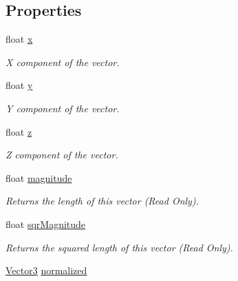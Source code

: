 \subsection*{Properties}
\begin{DoxyCompactItemize}
\item 
float \mbox{\hyperlink{class_lua_1_1_vector3_af2367a6c9fb9484cd8703ef20bbe3e2b}{x}}
\begin{DoxyCompactList}\small\item\em X component of the vector. \end{DoxyCompactList}\item 
float \mbox{\hyperlink{class_lua_1_1_vector3_a93844cc4b95c4b4cc2152ecd3d6a69ed}{y}}
\begin{DoxyCompactList}\small\item\em Y component of the vector. \end{DoxyCompactList}\item 
float \mbox{\hyperlink{class_lua_1_1_vector3_a80737d9f0e18357fd716e47a1b82ef6a}{z}}
\begin{DoxyCompactList}\small\item\em Z component of the vector. \end{DoxyCompactList}\item 
float \mbox{\hyperlink{class_lua_1_1_vector3_af7a889228914dff8226722de5c47a9b7}{magnitude}}
\begin{DoxyCompactList}\small\item\em Returns the length of this vector (Read Only). \end{DoxyCompactList}\item 
float \mbox{\hyperlink{class_lua_1_1_vector3_a29cb25eb011222ce12a27338eb3aa0a2}{sqr\+Magnitude}}
\begin{DoxyCompactList}\small\item\em Returns the squared length of this vector (Read Only). \end{DoxyCompactList}\item 
\mbox{\hyperlink{class_lua_1_1_vector3}{Vector3}} \mbox{\hyperlink{class_lua_1_1_vector3_a4e2f1c26b10b35c7a23108cfaa63320c}{normalized}}

\end{DoxyCompactItemize}
